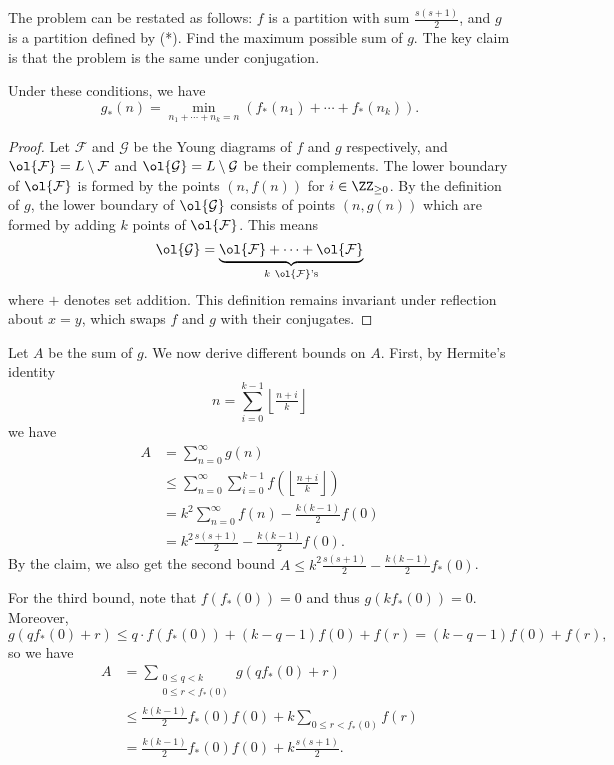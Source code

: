 The problem can be restated as follows: $f$ is a partition with sum
$\frac{s(s+1)}{2}$, and $g$ is a partition defined by (*). Find the maximum
possible sum of $g$. The key claim is that the problem is the
same under conjugation.
\begin{claim*}
  Under these conditions, we have
  \[
    g_*(n) = \min_{n_1+\dotsb+n_k=n}(f_*(n_1)+\dotsb+f_*(n_k)).
  \]
\end{claim*}

\begin{proof}
  Let $\mathcal{F}$ and $\mathcal{G}$ be the Young diagrams of $f$ and $g$
  respectively, and $\ol{\mathcal{F}} = L\setminus \mathcal{F}$ and
  $\ol{\mathcal{G}} = L\setminus \mathcal{G}$ be their complements. The
  lower boundary of $\ol{\mathcal{F}}$ is formed by the points $(n, f(n))$
  for $i\in \ZZ_{\geq 0}$. By the definition of $g$, the lower boundary
  of $\ol{\mathcal{G}}$
  consists of points $(n, g(n))$ which are formed by adding $k$ points of
  $\ol{\mathcal{F}}$. This means
  \[
    \ol{\mathcal{G}} = \underbrace{\ol{\mathcal{F}} + \dots +
    \ol{\mathcal{F}}}_{k \ \ol{\mathcal{F}}\text{'s}}
  \]
  where $+$ denotes set addition. This definition remains invariant under
  reflection about $x=y$, which swaps $f$ and $g$ with their conjugates.
\end{proof}

Let $A$ be the sum of $g$. We now derive different bounds on $A$. First, by
Hermite's identity
\[n = \sum_{i=0}^{k-1}\left\lfloor\tfrac{n+i}{k}\right\rfloor\]
we have
\begin{align*}
  A &= \sum_{n=0}^{\infty} g(n) \\
    & \leq \sum_{n=0}^{\infty} \sum_{i=0}^{k-1} f\left( \left\lfloor
    \tfrac{n+i}{k} \right\rfloor \right) \\
    &= k^2 \sum_{n=0}^{\infty}f(n) - \frac{k(k-1)}{2}f(0) \\
    &= k^2\frac{s(s+1)}{2}-\frac{k(k-1)}{2}f(0).
\end{align*}
By the claim, we also get the second bound $A \leq k^2 \frac{s(s+1)}{2} -
\frac{k(k-1)}{2}f_*(0)$.

For the third bound, note that $f(f_*(0)) = 0$ and thus $g(k f_*(0)) = 0$. Moreover,
\[g(q f_*(0) + r) \le q \cdot f(f_*(0)) + (k-q-1) f(0) + f(r) = (k-q-1)f(0) +
f(r),\]
so we have
\begin{align*}
A &= \sum_{\substack{0 \leq q < k \\ 0 \leq r < f_*(0)}} g(qf_*(0) + r) \\
& \le \frac{k(k-1)}{2}f_*(0)f(0) + k \sum_{0 \leq r < f_*(0)} f(r) \\
&= \frac{k(k-1)}{2} f_*(0)f(0) + k\frac{s(s+1)}{2}.
\end{align*}

